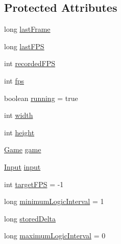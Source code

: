 \subsection*{Protected Attributes}
\begin{DoxyCompactItemize}
\item 
long \mbox{\hyperlink{classorg_1_1newdawn_1_1slick_1_1_game_container_ab61d2b2082e7bdf429ded14d1caa5484}{last\+Frame}}
\item 
long \mbox{\hyperlink{classorg_1_1newdawn_1_1slick_1_1_game_container_a04cdf0b74c76425818a11bb0404d5576}{last\+F\+PS}}
\item 
int \mbox{\hyperlink{classorg_1_1newdawn_1_1slick_1_1_game_container_a1b65e4d07aaae2b711971a95e55667be}{recorded\+F\+PS}}
\item 
int \mbox{\hyperlink{classorg_1_1newdawn_1_1slick_1_1_game_container_aee0fed3a01c1063c678bfb7b1d950aa1}{fps}}
\item 
boolean \mbox{\hyperlink{classorg_1_1newdawn_1_1slick_1_1_game_container_a3669a46ff5897be04ea1e4c9ede84de9}{running}} = true
\item 
int \mbox{\hyperlink{classorg_1_1newdawn_1_1slick_1_1_game_container_a8c65160202b9f5aafde3fcf03e6155c9}{width}}
\item 
int \mbox{\hyperlink{classorg_1_1newdawn_1_1slick_1_1_game_container_aac7312a21bbcaabec14be965c683d970}{height}}
\item 
\mbox{\hyperlink{interfaceorg_1_1newdawn_1_1slick_1_1_game}{Game}} \mbox{\hyperlink{classorg_1_1newdawn_1_1slick_1_1_game_container_a6a38bb26e45e1c884940caf35c7cfcdc}{game}}
\item 
\mbox{\hyperlink{classorg_1_1newdawn_1_1slick_1_1_input}{Input}} \mbox{\hyperlink{classorg_1_1newdawn_1_1slick_1_1_game_container_a2902f3d98d24fc41fc32d591f39eb587}{input}}
\item 
int \mbox{\hyperlink{classorg_1_1newdawn_1_1slick_1_1_game_container_a2b2c1237fa5ca2e45a98d70c6196a8b4}{target\+F\+PS}} = -\/1
\item 
long \mbox{\hyperlink{classorg_1_1newdawn_1_1slick_1_1_game_container_aad789db3caee5d97a3e6d82adcdbe7c1}{minimum\+Logic\+Interval}} = 1
\item 
long \mbox{\hyperlink{classorg_1_1newdawn_1_1slick_1_1_game_container_a3c61b6afaf9207ebd0871141981829c2}{stored\+Delta}}
\item 
long \mbox{\hyperlink{classorg_1_1newdawn_1_1slick_1_1_game_container_ac204ec48e1105e745aca11cd0b1c4a3e}{maximum\+Logic\+Interval}} = 0
\item 

\end{DoxyCompactItemize}
